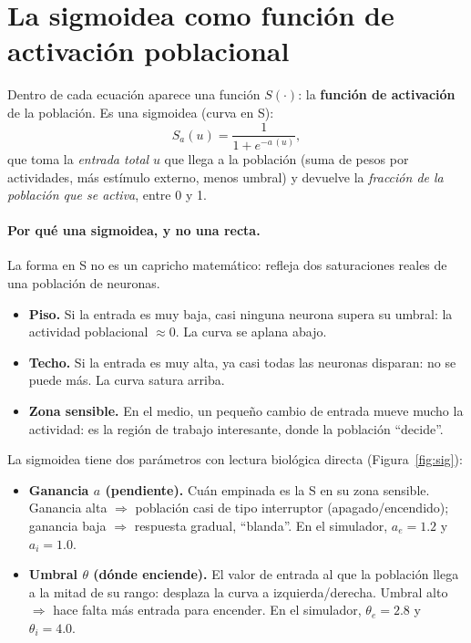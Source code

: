 \documentclass[11pt,a4paper]{article}
\begin{document}
\section{La sigmoidea como función de activación poblacional}

Dentro de cada ecuación aparece una función $S(\cdot)$: la \textbf{función de activación} de la población. Es una sigmoidea (curva en S):
\begin{equation}
S_a(u)=\frac{1}{1+e^{-a\,(u)}},
\end{equation}
que toma la \emph{entrada total} $u$ que llega a la población (suma de pesos por actividades, más estímulo externo, menos umbral) y devuelve la \emph{fracción de la población que se activa}, entre 0 y 1.

\paragraph{Por qué una sigmoidea, y no una recta.} La forma en S no es un capricho matemático: refleja dos saturaciones reales de una población de neuronas.
\begin{itemize}[leftmargin=1.4em,itemsep=2pt]
  \item \textbf{Piso.} Si la entrada es muy baja, casi ninguna neurona supera su umbral: la actividad poblacional $\approx 0$. La curva se aplana abajo.
  \item \textbf{Techo.} Si la entrada es muy alta, ya casi todas las neuronas disparan: no se puede más. La curva satura arriba.
  \item \textbf{Zona sensible.} En el medio, un pequeño cambio de entrada mueve mucho la actividad: es la región de trabajo interesante, donde la población ``decide''.
\end{itemize}

La sigmoidea tiene dos parámetros con lectura biológica directa (Figura~\ref{fig:sig}):
\begin{itemize}[leftmargin=1.4em,itemsep=2pt]
  \item \textbf{Ganancia $a$ (pendiente).} Cuán empinada es la S en su zona sensible. Ganancia alta $\Rightarrow$ población casi de tipo interruptor (apagado/encendido); ganancia baja $\Rightarrow$ respuesta gradual, ``blanda''. En el simulador, $a_e=1.2$ y $a_i=1.0$.
  \item \textbf{Umbral $\theta$ (dónde enciende).} El valor de entrada al que la población llega a la mitad de su rango: desplaza la curva a izquierda/derecha. Umbral alto $\Rightarrow$ hace falta más entrada para encender. En el simulador, $\theta_e=2.8$ y $\theta_i=4.0$.
\end{itemize}
\end{document}
